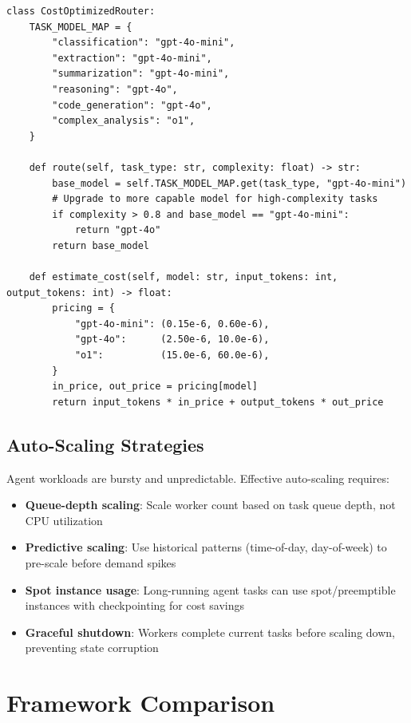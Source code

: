 \begin{lstlisting}[style=pythonstyle, caption={Model routing for cost optimization}]
class CostOptimizedRouter:
    TASK_MODEL_MAP = {
        "classification": "gpt-4o-mini",
        "extraction": "gpt-4o-mini",
        "summarization": "gpt-4o-mini",
        "reasoning": "gpt-4o",
        "code_generation": "gpt-4o",
        "complex_analysis": "o1",
    }

    def route(self, task_type: str, complexity: float) -> str:
        base_model = self.TASK_MODEL_MAP.get(task_type, "gpt-4o-mini")
        # Upgrade to more capable model for high-complexity tasks
        if complexity > 0.8 and base_model == "gpt-4o-mini":
            return "gpt-4o"
        return base_model

    def estimate_cost(self, model: str, input_tokens: int, output_tokens: int) -> float:
        pricing = {
            "gpt-4o-mini": (0.15e-6, 0.60e-6),
            "gpt-4o":      (2.50e-6, 10.0e-6),
            "o1":          (15.0e-6, 60.0e-6),
        }
        in_price, out_price = pricing[model]
        return input_tokens * in_price + output_tokens * out_price
\end{lstlisting}

\subsection{Auto-Scaling Strategies}
\label{auto-scaling-strategies}

Agent workloads are bursty and unpredictable. Effective auto-scaling requires:

\begin{itemize}
  \item \textbf{Queue-depth scaling}: Scale worker count based on task queue depth, not CPU utilization
  \item \textbf{Predictive scaling}: Use historical patterns (time-of-day, day-of-week) to pre-scale before demand spikes
  \item \textbf{Spot instance usage}: Long-running agent tasks can use spot/preemptible instances with checkpointing for cost savings
  \item \textbf{Graceful shutdown}: Workers complete current tasks before scaling down, preventing state corruption
\end{itemize}

\section{Framework Comparison}
\label{subsec:framework-comparison}

